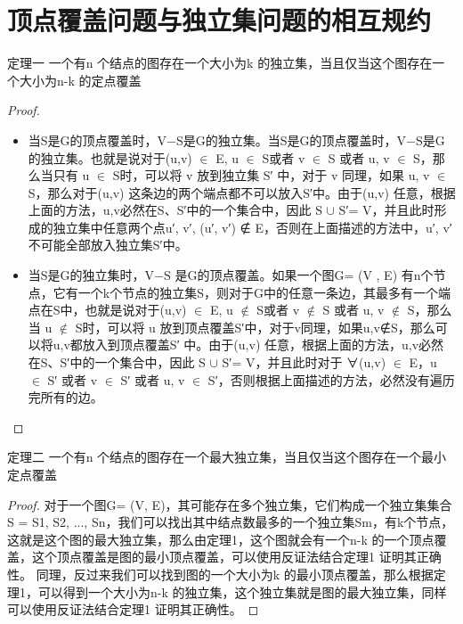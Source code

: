 \section{顶点覆盖问题与独立集问题的相互规约}

\begin{theorem}{定理一}
    一个有n 个结点的图存在一个大小为k 的独立集，当且仅当这个图存在一个大小为n-k 的定点覆盖
\end{theorem}

\begin{proof}
    \begin{itemize}
        \item 当S是G的顶点覆盖时，V−S是G的独立集。当S是G的顶点覆盖时，V−S是G的独立集。也就是说对于(u,v) $\in$ E, u $\in$ S或者 v $\in$ S 或者 u, v $\in$ S，那么当只有 u $\in$ S时，可以将 v 放到独立集 S′ 中，对于 v 同理，如果 u, v $\in$ S，那么对于(u,v) 这条边的两个端点都不可以放入S′中。由于(u,v) 任意，根据上面的方法，u,v必然在S、S′中的一个集合中，因此 S $\cup$ S′= V，并且此时形成的独立集中任意两个点u′, v′, (u′, v′) ∉ E，否则在上面描述的方法中，u′, v′不可能全部放入独立集S′中。
        \item 当S是G的独立集时，V−S 是G的顶点覆盖。如果一个图G= (V , E) 有n个节点，它有一个k个节点的独立集S，则对于G中的任意一条边，其最多有一个端点在S中，也就是说对于(u,v) $\in$ E, u $\notin$ S或者 v $\notin$ S 或者 u, v $\notin$ S，那么当 u $\notin$ S时，可以将 u 放到顶点覆盖S′中，对于v同理，如果u,v∉S，那么可以将u,v都放入到顶点覆盖S′ 中。由于(u,v) 任意，根据上面的方法，u,v必然在S、S′中的一个集合中，因此 S $\cup$ S′= V，并且此时对于 ∀(u,v) $\in$ E，u $\in$ S′ 或者 v $\in$ S′ 或者 u, v $\in$ S′，否则根据上面描述的方法，必然没有遍历完所有的边。
    \end{itemize} 
\end{proof}


\begin{theorem}{定理二}
    一个有n 个结点的图存在一个最大独立集，当且仅当这个图存在一个最小定点覆盖
\end{theorem}

\begin{proof}
    对于一个图G= (V, E)，其可能存在多个独立集，它们构成一个独立集集合S = {S1, S2, ..., Sn}，我们可以找出其中结点数最多的一个独立集Sm，有k个节点，这就是这个图的最大独立集，那么由定理1，这个图就会有一个n-k 的一个顶点覆盖，这个顶点覆盖是图的最小顶点覆盖，可以使用反证法结合定理1 证明其正确性。
    同理，反过来我们可以找到图的一个大小为k 的最小顶点覆盖，那么根据定理1，可以得到一个大小为n-k 的独立集，这个独立集就是图的最大独立集，同样可以使用反证法结合定理1 证明其正确性。
\end{proof}
